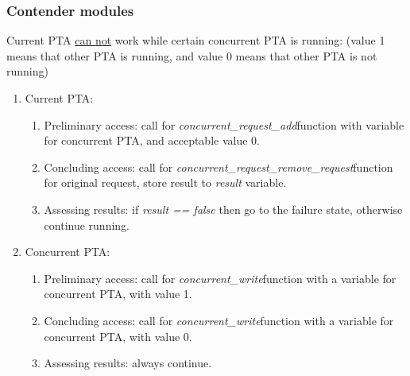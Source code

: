 \subsubsection{Contender modules \label{memory_module_applications_contender_modules}}
Current PTA \underline{can not} work while certain concurrent PTA is running: (value 1 means that other PTA is running, and value 0 means that other PTA is not running)
\begin{enumerate}  
\item Current PTA:
\begin{enumerate}  
\item Preliminary access: call for \textcolor{ColorUppaalFunction}{\textit{concurrent_request_add}}​ function with variable for concurrent PTA, and acceptable value 0.  
\item Concluding access: call for \textcolor{ColorUppaalFunction}{\textit{concurrent_request_remove_request}}​ function for original request, store result to \textcolor{ColorEdgeGuard}{\textit{result}} variable.  
\item Assessing results: if \textcolor{ColorEdgeGuard}{\textit{result == false}} then go to the failure state, otherwise continue running.
\end{enumerate}  
\item Concurrent PTA:
\begin{enumerate}  
\item Preliminary access: call for \textcolor{ColorUppaalFunction}{\textit{concurrent_write}}​ function with a variable for concurrent PTA, with value 1.  
\item Concluding access: call for \textcolor{ColorUppaalFunction}{\textit{concurrent_write}}​ function with a variable for concurrent PTA, with value 0.  
\item Assessing results: always continue.
\end{enumerate}
\end{enumerate}
